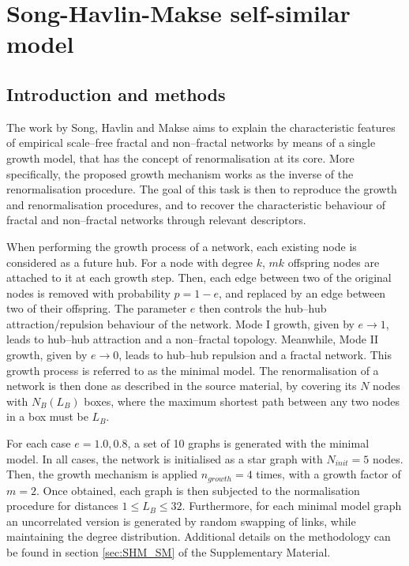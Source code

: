 \chapter{Song-Havlin-Makse self-similar model}


\section{Introduction and methods}
 
The work by Song, Havlin and Makse \cite{song2006origins} aims to explain the characteristic features of empirical scale--free fractal and non--fractal networks by means of a single growth model, that has the concept of renormalisation at its core. More specifically, the proposed growth mechanism works as the inverse of the renormalisation procedure. The goal of this task is then to reproduce the growth and renormalisation procedures, and to recover the characteristic behaviour of fractal and non--fractal networks through relevant descriptors. 

When performing the growth process of a network, each existing node is considered as a future hub. For a node with degree $k$, $mk$ offspring nodes are attached to it at each growth step. Then, each edge between two of the original nodes is removed with probability $p=1-e$, and replaced by an edge between two of their offspring. The parameter $e$ then controls the hub--hub attraction/repulsion behaviour of the network. Mode I growth, given by $e\rightarrow1$, leads to hub--hub attraction and a non--fractal topology. Meanwhile, Mode II growth, given by $e\rightarrow0$, leads to hub--hub repulsion and a fractal network. This growth process is referred to as the minimal model. The renormalisation of a network is then done as described in the source material, by covering its $N$ nodes with $N_B(L_B)$ boxes, where the maximum shortest path between any two nodes in a box must be $L_B$.

For each case $e=1.0, 0.8$, a set of 10 graphs is generated with the minimal model. In all cases, the network is initialised as a star graph with $N_{init}=5$ nodes. Then, the growth mechanism is applied $n_{growth}=4$ times, with a growth factor of $m=2$. Once obtained, each graph is then subjected to the normalisation procedure for distances $1\leq L_B\leq32$. Furthermore, for each minimal model graph an uncorrelated version is generated by random swapping of links, while maintaining the degree distribution. Additional details on the methodology can be found in section \ref{sec:SHM_SM} of the Supplementary Material.


